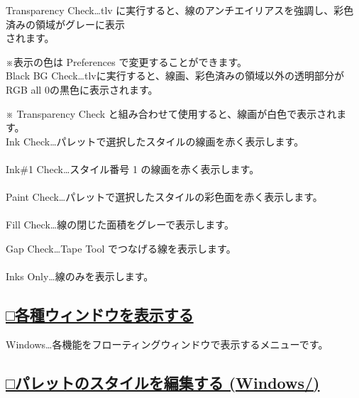 \documentclass[a4paper,10pt]{article}
\begin{document}
\noindent Transparency Check…tlv に実行すると、線のアンチエイリアスを強調し、彩色済みの領域がグレーに表示\\
されます。\par
\footnotesize
\noindent ※表示の色は Preferences で変更することができます。\\[1em]
\normalsize Black BG Check…tlvに実行すると、線画、彩色済みの領域以外の透明部分がRGB all 0の黒色に表示されます。\par
\footnotesize
\noindent ※ Transparency Check と組み合わせて使用すると、線画が白色で表示されます。\\[1em]
\normalsize Ink Check…パレットで選択したスタイルの線画を赤く表示します。\\[-0.1em]
\\
Ink\#1 Check…スタイル番号 1 の線画を赤く表示します。\\[-0.1em]
\\
Paint Check…パレットで選択したスタイルの彩色面を赤く表示します。\\[-0.1em]
\\
Fill Check…線の閉じた面積をグレーで表示します。

\newpage

\noindent Gap Check…Tape Tool でつなげる線を表示します。\\[-0.1em]
\\
Inks Only…線のみを表示します。\\[1em]

\subsection*{\uline{□各種ウィンドウを表示する}}

\noindent Windows…各機能をフローティングウィンドウで表示するメニューです。\\[1em]

\subsection*{\uline{□パレットのスタイルを編集する (Windows/)}}
\end{document}

